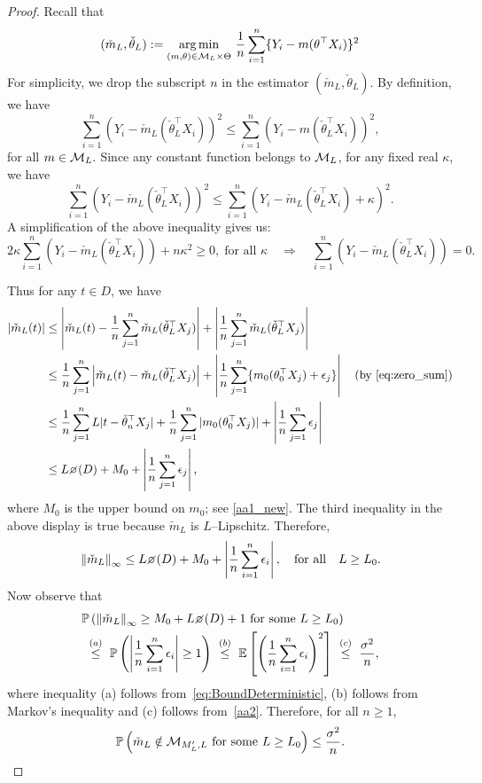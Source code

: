 \begin{proof}
Recall that
\[
(\check{m}_{{L}},\check{\theta}_{{L}}) := \operatorname*{arg\,min}_{(m,\theta)\in\mathcal{M}_{L} \times\Theta}\,\frac{1}{n}\sum_{i=1}^n \{Y_i-m(\theta^{\top}X_i)\}^2
\]
For simplicity, we drop the subscript $n$ in the estimator $(\check{m}_{{L}},\check{\theta}_{{L}})$.
By definition, we have
\[
\sum_{i=1}^n(Y_i - \check{m}_L(\check{\theta}_L^\top X_i))^2 \le \sum_{i=1}^n(Y_i - m(\check{\theta}_L^\top X_i))^2,
\] 
for all $m\in \mathcal{M}_L.$ Since any constant function belongs to $\mathcal{M}_L$, for any fixed real $\kappa$, we have
\[
\sum_{i=1}^n(Y_i - \check{m}_L(\check{\theta}_L^\top X_i))^2 \le \sum_{i=1}^n(Y_i - \check{m}_L(\check{\theta}_L^\top X_i) + \kappa)^2.
\]
A simplification of the  above inequality gives us:
\begin{equation}\label{eq:zero_sum}
2\kappa\sum_{i=1}^n(Y_i - \check{m}_L(\check\theta_L^\top X_i)) + n\kappa^2 \ge 0,\;\mbox{for all }\kappa\quad\Rightarrow\quad \sum_{i=1}^n(Y_i - \check{m}_L(\check{\theta}_L^\top X_i)) = 0.
\end{equation}

Thus for any $t\in D$, we have
\begin{align*}
|\check{m}_L(t)|&\le \left|\check{m}_L(t) - \frac{1}{n}\sum_{j=1}^n \check{m}_L(\check{\theta}_L^\top X_j)\right| + \left|\frac{1}{n}\sum_{j=1}^n \check{m}_L(\check{\theta}_L^\top X_j)\right|\\
&\le \frac{1}{n}\sum_{j=1}^n \left|\check{m}_L(t) - \check{m}_L(\check{\theta}_L^\top X_j)\right| + \left|\frac{1}{n}\sum_{j=1}^n \{m_0({\theta}_0^\top X_j) + \epsilon_j\}\right| \quad \text{(by~\eqref{eq:zero_sum})}\\
&\le \frac{1}{n}\sum_{j=1}^n L|t - \check{\theta}_n^\top X_j| + \frac{1}{n}\sum_{j=1}^n|m_0({\theta}_0^\top X_j)| + \left|\frac{1}{n}\sum_{j=1}^n \epsilon_j\right|\\
&\le L\diameter(D) + M_0 + \left|\frac{1}{n}\sum_{j=1}^n \epsilon_j\right|,
\end{align*}
where $M_0$ is the upper bound on $m_0$; see \ref{aa1_new}. The third inequality in the above display is true because $\check{m}_L$ is $L$--Lipschitz. Therefore, 
\begin{equation}\label{eq:BoundDeterministic}
\norm{\check{m}_L}_{\infty} \le L\diameter(D) + M_0 + \left|\frac{1}{n}\sum_{i=1}^n \epsilon_i\right|,\quad\mbox{for all}\quad L \ge L_0.
\end{equation}
Now observe that
\begin{align*}
&\mathbb{P}\left(\norm{\check{m}_L}_{\infty} \ge M_0 + L\diameter(D) + 1\mbox{ for some $L \ge L_0$}\right)\\ {}&~\overset{(a)}{\le}~ \mathbb{P}\left(\left|\frac{1}{n}\sum_{i=1}^n \epsilon_i\right| \ge 1\right) ~\overset{(b)}{\le}~ \mathbb{E}\left[\left(\frac{1}{n}\sum_{i=1}^n \epsilon_i\right)^2\right] ~\overset{(c)}{\le}~ \frac{\sigma^2}{n},
\end{align*}
where inequality (a) follows from~\eqref{eq:BoundDeterministic}, (b) follows from Markov's inequality and (c) follows from~\ref{aa2}. Therefore, for all $n\ge 1$,
\[
\mathbb{P}\left(\check{m}_L \notin \mathcal{M}_{M'_L, L}\mbox{ for some }L \ge L_0\right) \le \frac{\sigma^2}{n}.\qedhere
\]
\end{proof}

